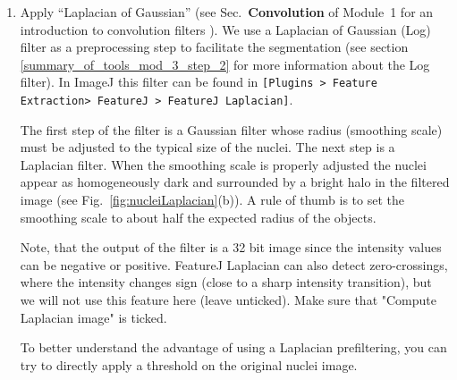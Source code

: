 \documentclass[11pt,a4paper,oneside]{report}
\newcommand{\ijmenu}[1]{\texttt{\small#1}}
\begin{document}
\begin{enumerate}
    \item Apply ``Laplacian of Gaussian'' (see Sec.~\textbf{Convolution} of Module~1 for an introduction to convolution filters ). We use a Laplacian of Gaussian (Log) filter as a preprocessing step to facilitate the segmentation (see section \ref{summary_of_tools_mod_3_step_2} for more information about the Log filter). In ImageJ this filter can be found in \ijmenu{[Plugins > Feature Extraction> FeatureJ > FeatureJ Laplacian]}.
    
    The first step of the filter is a Gaussian filter whose radius (smoothing scale) must be adjusted to the typical size of the nuclei. The next step is a Laplacian filter. When the smoothing scale is properly adjusted the nuclei appear as homogeneously dark and surrounded by a bright halo in the filtered image (see Fig.~\ref{fig:nucleiLaplacian}(b)). A rule of thumb is to set the smoothing scale to about half the expected radius of the objects. 
    
    Note, that the output of the filter is a 32 bit image since the intensity values can be negative or positive. FeatureJ Laplacian can also detect zero-crossings, where the intensity changes sign (close to a sharp intensity transition), but we will not use this feature here (leave unticked). Make sure that "Compute Laplacian image" is ticked.
    
    To better understand the advantage of using a Laplacian prefiltering, you can try to directly apply a threshold on the original nuclei image.


\end{enumerate}
\end{document}
